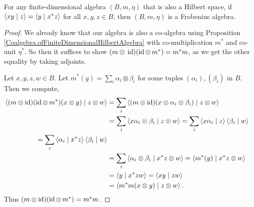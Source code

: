  \begin{proposition}\label{FiniteDimensionalCoAlgebra_isFrobeniusAlgebra_of}
  \leanok
  For any finite-dimensional algebra $(B,m,\eta)$ that is also a Hilbert space, if $\left\langle xy \mid z\right\rangle=\left\langle y \mid x^*z\right\rangle$ for all $x,y,z\in B$, then $(B,m,\eta)$ is a Frobenius algebra.
 \end{proposition}
 \begin{proof}\leanok
  We already know that our algebra is also a co-algebra using Proposition \ref{Coalgebra.ofFiniteDimensionalHilbertAlgebra} with co-multiplication $m^*$ and co-unit $\eta^*$.
  So then it suffices to show $(m\otimes\,\operatorname{id})(\operatorname{id}\otimes\,m^*)=m^*m$, as we get the other equality by taking adjoints.

  Let $x,y,z,w\in{B}$. Let $m^*(y)=\sum_i\alpha_i\otimes\beta_i$ for some tuples $(\alpha_i),(\beta_i)$ in $B$. Then we compute,
  \begin{align*}
   \left\langle(m\otimes\operatorname{id})(\operatorname{id}\otimes\,m^*)(x\otimes y) \mid z\otimes w\right\rangle
   &= \sum_i\left\langle(m\otimes\operatorname{id})(x\otimes\alpha_i\otimes\beta_i) \mid z\otimes w\right\rangle\\
   &= \sum_i\left\langle x\alpha_i\otimes\beta_i \mid z\otimes w\right\rangle
   = \sum_i\left\langle x\alpha_i \mid z\right\rangle\left\langle\beta_i \mid w\right\rangle\\
   = \sum_i\left\langle\alpha_i \mid x^*z\right\rangle\left\langle\beta_i \mid w\right\rangle\\
   &= \sum_i\left\langle\alpha_i\otimes\beta_i \mid x^*z\otimes w\right\rangle=\left\langle m^*(y) \mid x^*z\otimes w\right\rangle\\
   &= \left\langle y \mid x^*zw\right\rangle=\left\langle xy \mid zw\right\rangle\\
   &= \left\langle m^*m(x\otimes y) \mid z\otimes w\right\rangle.
  \end{align*}
  Thus $(m\otimes\operatorname{id})(\operatorname{id}\otimes\,m^*)=m^*m$.
 \end{proof}
